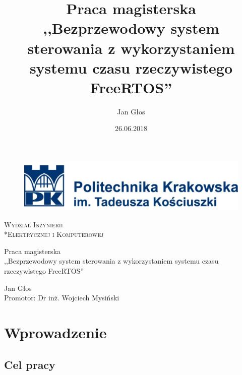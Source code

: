 \documentclass[a4paper, 11pt]{report}
\title{\huge{Praca magisterska\\ ,,Bezprzewodowy system sterowania z wykorzystaniem systemu czasu rzeczywistego FreeRTOS''}}
\author{Jan Głos}
\date{26.06.2018}
\begin{document}
\thispagestyle{empty}
\begin{figure}[t]
\centering
\includegraphics[width=14cm]{files/pk}
\end{figure}
\vspace{8cm}
\begin{Huge}
\begin{center}
\textsc{Wydział Inżynierii \\*Elektrycznej i Komputerowej}
\end{center}
\end{Huge}
\vspace{2cm}
\begin{center}
\begin{huge}
Praca magisterska\\ ,,Bezprzewodowy system sterowania z wykorzystaniem systemu czasu rzeczywistego FreeRTOS''\\
\end{huge}
\vspace{2cm}
\begin{LARGE}
Jan Głos\\

\vspace{5cm}
Promotor: \hfill Dr inż. Wojciech Mysiński
\hfill
\end{LARGE}
\end{center}

\newpage
\begin{small}
\tableofcontents
\end{small}


\newpage
\chapter{Wprowadzenie}
\section{Cel pracy}
\end{document}
